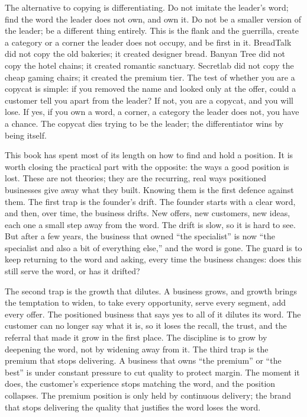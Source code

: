 \documentclass[10pt,twoside,openany]{memoir}
\begin{document}
{The alternative to copying is differentiating. Do not imitate the
leader's word; find the word the leader does not own, and own it. Do not
be a smaller version of the leader; be a different thing entirely. This
is the flank and the guerrilla, create a category or a corner the leader
does not occupy, and be first in it. BreadTalk did not copy the old
bakeries; it created designer bread. Banyan Tree did not copy the hotel
chains; it created romantic sanctuary. Secretlab did not copy the cheap
gaming chairs; it created the premium tier. The test of whether you are
a copycat is simple: if you removed the name and looked only at the
offer, could a customer tell you apart from the leader? If not, you are
a copycat, and you will lose. If yes, if you own a word, a corner, a
category the leader does not, you have a chance. The copycat dies trying
to be the leader; the differentiator wins by being itself.

This book has spent most of its length on how to find and hold a
position. It is worth closing the practical part with the opposite: the
ways a good position is lost. These are not theories; they are the
recurring, real ways positioned businesses give away what they built.
Knowing them is the first defence against them. The first trap is the
founder's drift. The founder starts with a clear word, and then, over
time, the business drifts. New offers, new customers, new ideas, each
one a small step away from the word. The drift is slow, so it is hard to
see. But after a few years, the business that owned ``the specialist''
is now ``the specialist and also a bit of everything else,'' and the
word is gone. The guard is to keep returning to the word and asking,
every time the business changes: does this still serve the word, or has
it drifted?

The second trap is the growth that dilutes. A business grows, and growth
brings the temptation to widen, to take every opportunity, serve every
segment, add every offer. The positioned business that says yes to all
of it dilutes its word. The customer can no longer say what it is, so it
loses the recall, the trust, and the referral that made it grow in the
first place. The discipline is to grow by deepening the word, not by
widening away from it. The third trap is the premium that stops
delivering. A business that owns ``the premium'' or ``the best'' is
under constant pressure to cut quality to protect margin. The moment it
does, the customer's experience stops matching the word, and the
position collapses. The premium position is only held by continuous
delivery; the brand that stops delivering the quality that justifies the
word loses the word.

}
\end{document}

